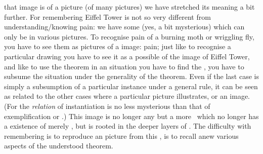that image is 
 of a picture (of many pictures) we have stretched its meaning a
bit further. For remembering Eiffel Tower is not so
very different from understanding/knowing pain: we have some (yes, a bit
mysterious)  which can only be  in various pictures.
To recognise pain of a burning moth or wriggling fly, you have to see them as
 pictures of a  image: pain; just like to recognise a
particular drawing you have to see it as a possible  of the
image of Eiffel Tower, and like to use the theorem in an  situation
you have to find the , you have to subsume the 
situation under the generality of the theorem. Even
if the last case is simply a subsumption of a particular instance under a
general rule, it can be seen as related to the other cases where a particular
picture illustrates, or  an image. (For the {\em relation} of
instantiation is no less mysterious than that of exemplification or
.) This image is no longer any  but
a more  \nexus\ which no longer has a  existence of
merely , but is rooted in the deeper layers of
. The difficulty with remembering is to reproduce an 
picture from this  \nexus, is to recall anew various aspects of the
understood theorem.  


